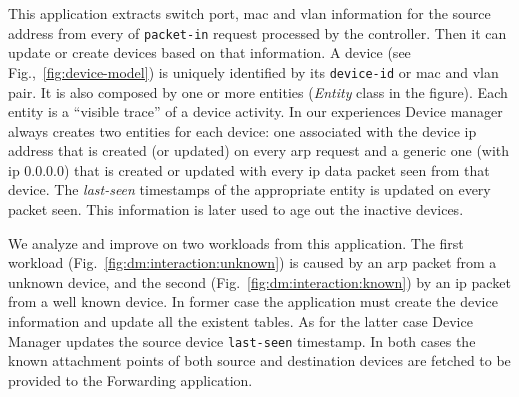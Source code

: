 \begin{figure}[ht]
\TopFloatBoxes
\begin{floatrow}

\end{floatrow}
\end{figure}

This application extracts  switch port, \gls{mac} and \gls{vlan} information for the source address from every \gls{of} \texttt{packet-in} request processed by the controller. 
Then it can update or create devices based on that information. 
A device (see Fig.,~\ref{fig:device-model}) is uniquely identified by its \texttt{device-id} or \gls{mac} and \gls{vlan} pair.
It is also composed by one or more entities (\emph{Entity} class in the figure). 
Each entity is a ``visible trace'' of a device activity. 
In our experiences Device manager always creates two entities for each device: one associated with the device \gls{ip} address that is created (or updated) on every \gls{arp} request and a generic one (with ip 0.0.0.0) that is created or updated with every \gls{ip} data packet seen from that device. The \emph{last-seen} timestamps of the appropriate  entity is updated on every packet seen. This information is later used to age out the inactive devices. 

We analyze and improve on two workloads from this application. 
The first workload (Fig.~\ref{fig:dm:interaction:unknown})  is caused by an \gls{arp} packet from a unknown device,  and the second (Fig.~\ref{fig:dm:interaction:known}) by an \gls{ip} packet from a well known device. 
In former case the application must create the device information and update all the existent tables. As for the latter case Device Manager updates the source device \texttt{last-seen} timestamp. 
In both cases the known attachment points of both source and destination devices  are fetched  to be provided  to the Forwarding application. 

